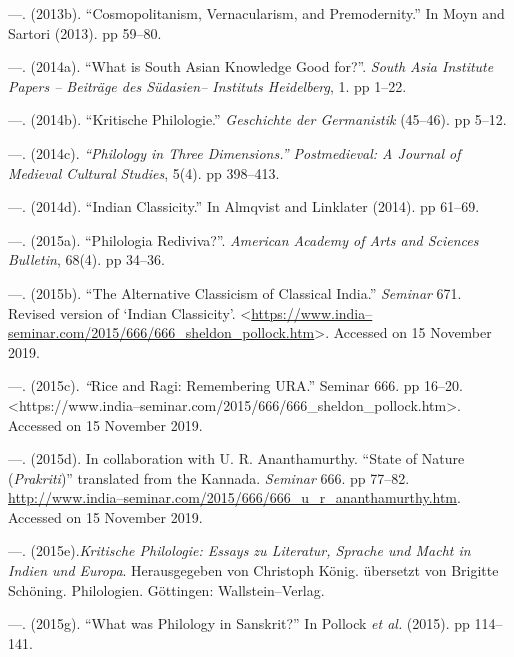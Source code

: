 \begin{thebibliography}{99}
 \item —. (2013b). “Cosmopolitanism, Vernacularism, and Premodernity.” In Moyn and Sartori (2013). pp 59–80.

 \item —. (2014a). “What is South Asian Knowledge Good for?”. \textit{South Asia Institute Papers – Beiträge des Südasien– Instituts Heidelberg}, 1. pp 1–22.

 \item —. (2014b). “Kritische Philologie.” \textit{Geschichte der Germanistik} (45–46). pp 5–12.

 \item —. (2014c).\textit{ “Philology in Three Dimensions.” Postmedieval: A Journal of Medieval Cultural Studies}, 5(4). pp 398–413.

 \item —. (2014d). “Indian Classicity.” In Almqvist and Linklater (2014). pp 61–69.

 \item —. (2015a). “Philologia Rediviva?”. \textit{American Academy of Arts and Sciences Bulletin}, 68(4). pp 34–36.

 \item —. (2015b). “The Alternative Classicism of Classical India.” \textit{Seminar} 671. Revised version of ‘Indian Classicity’. \textless \url{https://www.india–seminar.com/2015/666/666_sheldon_pollock.htm}\textgreater . Accessed on 15 November 2019.

 \item —. (2015c).\textit{ “}Rice and Ragi: Remembering URA.” Seminar 666. pp 16–20. \textless https://www.india–seminar.com/2015/666/666\_sheldon\_pollock.htm\textgreater . Accessed on 15 November 2019.

 \item —. (2015d). In collaboration with U. R. Ananthamurthy. “State of Nature (\textit{Prakriti})” translated from the Kannada. \textit{Seminar} 666. pp 77–82. \url{http://www.india–seminar.com/2015/666/666_u_r_ananthamurthy.htm}. Accessed on 15 November 2019.

 \item —. (2015e).\textit{Kritische Philologie: Essays zu Literatur, Sprache und Macht in Indien und Europa}. Herausgegeben von Christoph König. übersetzt von Brigitte Schöning. Philologien. Göttingen: Wallstein–Verlag.

 \item —. (2015g). “What was Philology in Sanskrit?” In Pollock \textit{et al.} (2015). pp 114–141.


\end{thebibliography}
